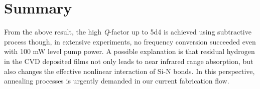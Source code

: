 \begin{figure}
	\centering
	
	\label{fig:dint_cvd_cf}
\end{figure}


\section{Summary}

From the above result, the high \textit{Q}-factor up to \num{5d4} is achieved using subtractive process though, in extensive experiments, no frequency conversion succeeded even with 100 mW level pump power. A possible explanation is that residual hydrogen in the CVD deposited films not only leads to near infrared range absorption, but also changes the effective nonlinear interaction of Si-N bonds. In this perspective, annealing processes is urgently demanded in our current fabrication flow.